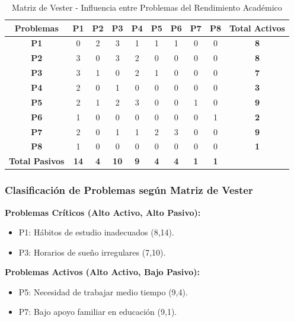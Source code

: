 \documentclass[12pt,letterpaper]{report}
\begin{document}
\begin{table}[H]
    \centering
    \begin{tabular}{|c|c|c|c|c|c|c|c|c|c|}
        \hline
        \textbf{Problemas} & \textbf{P1} & \textbf{P2} & \textbf{P3} & \textbf{P4} & \textbf{P5} & \textbf{P6} & \textbf{P7} & \textbf{P8} & \textbf{Total Activos} \\
        \hline
        \textbf{P1} & 0 & 2 & 3 & 1 & 1 & 1 & 0 & 0 & \textbf{8} \\
        \hline
        \textbf{P2} & 3 & 0 & 3 & 2 & 0 & 0 & 0 & 0 & \textbf{8} \\
        \hline
        \textbf{P3} & 3 & 1 & 0 & 2 & 1 & 0 & 0 & 0 & \textbf{7} \\
        \hline
        \textbf{P4} & 2 & 0 & 1 & 0 & 0 & 0 & 0 & 0 & \textbf{3} \\
        \hline
        \textbf{P5} & 2 & 1 & 2 & 3 & 0 & 0 & 1 & 0 & \textbf{9} \\
        \hline
        \textbf{P6} & 1 & 0 & 0 & 0 & 0 & 0 & 0 & 1 & \textbf{2} \\
        \hline
        \textbf{P7} & 2 & 0 & 1 & 1 & 2 & 3 & 0 & 0 & \textbf{9} \\
        \hline
        \textbf{P8} & 1 & 0 & 0 & 0 & 0 & 0 & 0 & 0 & \textbf{1} \\
        \hline
        \textbf{Total Pasivos} & \textbf{14} & \textbf{4} & \textbf{10} & \textbf{9} & \textbf{4} & \textbf{4} & \textbf{1} & \textbf{1} & \\
        \hline
    \end{tabular}
    \caption{Matriz de Vester - Influencia entre Problemas del Rendimiento Académico}
\end{table}

\subsubsection{Clasificación de Problemas según Matriz de Vester}

\textbf{Problemas Críticos (Alto Activo, Alto Pasivo):}
\begin{itemize}
    \item P1: Hábitos de estudio inadecuados (8,14).
    \item P3: Horarios de sueño irregulares (7,10).
\end{itemize}

\textbf{Problemas Activos (Alto Activo, Bajo Pasivo):}
\begin{itemize}
    \item P5: Necesidad de trabajar medio tiempo (9,4).
    \item P7: Bajo apoyo familiar en educación (9,1).
\end{itemize}
\end{document}
